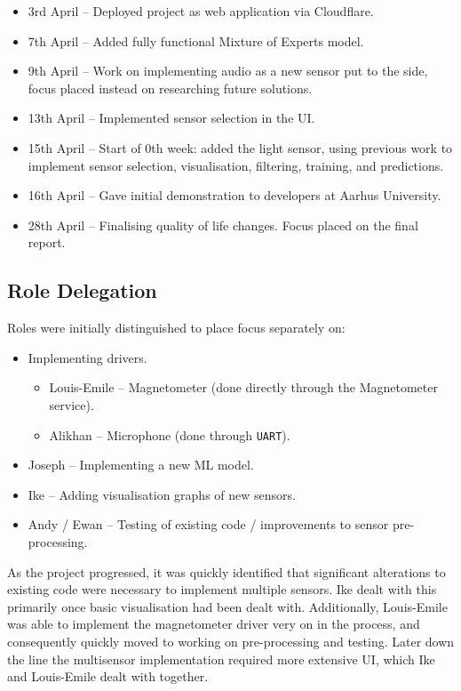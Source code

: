 \documentclass{article}
\begin{document}
\begin{itemize}
        \item 3rd April -- Deployed project as web application via Cloudflare.
        \item 7th April -- Added fully functional Mixture of Experts model.
        \item 9th April -- Work on implementing audio as a new sensor put to the side, focus placed instead on researching future solutions.
        \item 13th April -- Implemented sensor selection in the UI.
        \item 15th April -- Start of 0th week: added the light sensor, using previous work to implement sensor selection, visualisation, filtering, training, and predictions.
        \item 16th April -- Gave initial demonstration to developers at Aarhus University.
        \item 28th April -- Finalising quality of life changes. Focus placed on the final report.
\end{itemize}

\subsection{Role Delegation}%
\label{subsec:delegation}

Roles were initially distinguished to place focus separately on:
\begin{itemize}
  \item Implementing drivers.
        \begin{itemize}
          \item Louis-Emile -- Magnetometer (done directly through the Magnetometer service).
          \item Alikhan -- Microphone (done through \verb|UART|).
        \end{itemize}
  \item Joseph -- Implementing a new ML model.
  \item Ike -- Adding visualisation graphs of new sensors.
  \item Andy / Ewan -- Testing of existing code / improvements to sensor pre-processing.
\end{itemize}

As the project progressed, it was quickly identified that significant alterations to existing code were necessary to implement multiple sensors. Ike dealt with this primarily once basic visualisation had been dealt with. Additionally, Louis-Emile was able to implement the magnetometer driver very on in the process, and consequently quickly moved to working on pre-processing and testing. Later down the line the multisensor implementation required more extensive UI, which Ike and Louis-Emile dealt with together. \\
\end{document}
